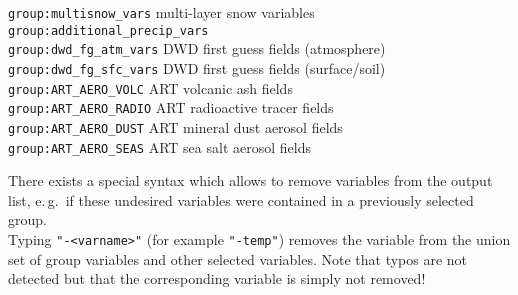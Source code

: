 \begin{tabbing}
\texttt{group:multisnow\_vars}         \>     multi-layer snow variables                                            \\
\texttt{group:additional\_precip\_vars}\>                                                                           \\
\texttt{group:dwd\_fg\_atm\_vars}      \>     DWD first guess fields (atmosphere)                                   \\
\texttt{group:dwd\_fg\_sfc\_vars}      \>     DWD first guess fields (surface/soil)                                 \\
\texttt{group:ART\_AERO\_VOLC}         \>     ART volcanic ash fields                                               \\
\texttt{group:ART\_AERO\_RADIO}        \>     ART radioactive tracer fields                                         \\
\texttt{group:ART\_AERO\_DUST}         \>     ART mineral dust aerosol fields                                       \\
\texttt{group:ART\_AERO\_SEAS}         \>     ART sea salt aerosol fields                                           \\
\end{tabbing}


\begin{note}
      There exists a special syntax which allows to remove variables from the output list, e.\,g.\ if
      these undesired variables were contained in a previously selected group.\\
      Typing \texttt{"-\textnormal{<varname>}"} (for example \texttt{"-temp"}) removes the
      variable from the union set of group variables and other selected variables.
      Note that typos are not detected but that the corresponding variable is
      simply not removed!
\end{note}

